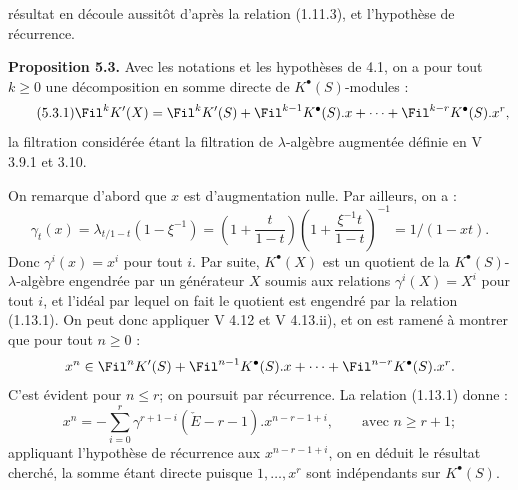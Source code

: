 résultat en découle aussitôt d'après la relation (1.11.3), et l'hypothèse de récurrence.

\textbf{Proposition 5.3.} Avec les notations et les hypothèses de 4.1, on a pour tout $k\ge 0$ une décomposition en somme directe de $K^{\bullet}(S)$-modules :
\begin{equation}\tag{5.3.1}
  \Fil^kK'(X)=\Fil^kK'(S)+\Fil^{k-1}K^{\bullet}(S).x+\cdots+\Fil^{k-r}K^{\bullet}(S).x^r,
\end{equation}
la filtration considérée étant la filtration de $\lambda$-algèbre augmentée définie en V 3.9.1 et 3.10.

On remarque d'abord que $x$ est d'augmentation nulle. Par ailleurs, on a :
\[
  \gamma_t(x)=\lambda_{t/1-t}(1-\xi^{-1})
  =\left(1+\frac{t}{1-t}\right)\left(1+\frac{\xi^{-1}t}{1-t}\right)^{-1}
  =1/(1-xt) .
\]
Donc $\gamma^i(x)=x^i$ pour tout $i$. Par suite, $K^{\bullet}(X)$ est un quotient de la $K^{\bullet}(S)$-$\lambda$-algèbre engendrée par un générateur $X$ soumis aux relations $\gamma^i(X)=X^i$ pour tout $i$, et l'idéal par lequel on fait le quotient est engendré par la relation (1.13.1). On peut donc appliquer V 4.12 et V 4.13.ii), et on est ramené à montrer que pour tout $n\ge 0$ :
\[
  x^n\in \Fil^nK'(S)+\Fil^{n-1}K^{\bullet}(S).x+\cdots+\Fil^{n-r}K^{\bullet}(S).x^r .
\]
C'est évident pour $n\le r$; on poursuit par récurrence. La relation (1.13.1) donne :
\[
  x^n=-\sum_{i=0}^{r}\gamma^{r+1-i}(\check E-r-1).x^{n-r-1+i},\qquad \text{avec } n\ge r+1;
\]
appliquant l'hypothèse de récurrence aux $x^{n-r-1+i}$, on en déduit le résultat cherché, la somme étant directe puisque $1,\ldots,x^r$ sont indépendants sur $K^{\bullet}(S)$.

